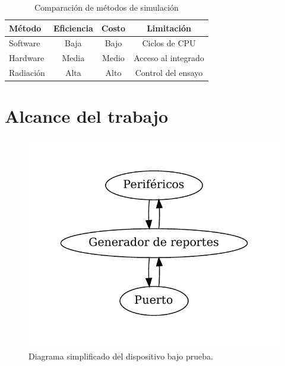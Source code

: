 \begin{table}[h]
	\centering
	\caption[Comparación de métodos de simulación]{Comparación de métodos de simulación\citep{ARTICLE:velazco}}
	\begin{tabular}{l c c c}    
		\toprule
        \textbf{Método} & \textbf{Eficiencia} & \textbf{Costo} & \textbf{Limitación}\\
		\midrule
        Software        & Baja                & Bajo           & Ciclos de CPU\\		
        Hardware        & Media               & Medio          & Acceso al integrado\\
        Radiación       & Alta                & Alto           & Control del ensayo\\
		\bottomrule
		\hline
	\end{tabular}
	\label{tab:arte}
\end{table}

\section{Alcance del trabajo}

\begin{figure}[htbp]
	\centering
	\includegraphics[width=.8\textwidth]{./Figures/dutsimple.pdf}
    \caption{Diagrama simplificado del dispositivo bajo prueba.}
	\label{fig:dutsimple}
\end{figure}

